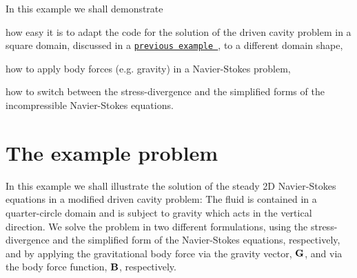 In this example we shall demonstrate
\begin{DoxyItemize}
\item how easy it is to adapt the code for the solution of the driven cavity problem in a square domain, discussed in a \href{../../adaptive_driven_cavity/html/index.html}{\tt previous example }, to a different domain shape,
\item how to apply body forces (e.\+g. gravity) in a Navier-\/\+Stokes problem,
\item how to switch between the stress-\/divergence and the simplified forms of the incompressible Navier-\/\+Stokes equations.
\end{DoxyItemize}

 

\hypertarget{index_example}{}\section{The example problem}\label{index_example}
In this example we shall illustrate the solution of the steady 2D Navier-\/\+Stokes equations in a modified driven cavity problem\+: The fluid is contained in a quarter-\/circle domain and is subject to gravity which acts in the vertical direction. We solve the problem in two different formulations, using the stress-\/divergence and the simplified form of the Navier-\/\+Stokes equations, respectively, and by applying the gravitational body force via the gravity vector, $ {\bf G} $, and via the body force function, $ {\bf B}$, respectively.

